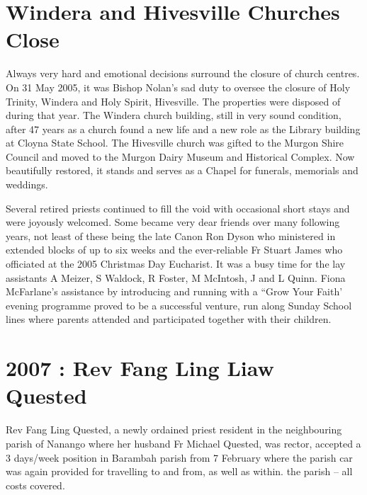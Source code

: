 \section{Windera and Hivesville Churches Close}



Always very hard and emotional decisions surround the closure of church centres. On 31 May 2005, it was Bishop Nolan's sad duty to oversee the closure of Holy Trinity, Windera and Holy Spirit, Hivesville. The properties were disposed of during that year. The Windera church building, still in very sound condition, after 47 years as a church found a new life and a new role as the Library building at Cloyna State School. The Hivesville church was gifted to the Murgon Shire Council and moved to the Murgon Dairy Museum and Historical Complex. Now beautifully restored, it stands and serves as a Chapel for funerals, memorials and weddings.



Several retired priests continued to fill the void with occasional short stays and were joyously welcomed. Some became very dear friends over many following years, not least of these being the late Canon Ron Dyson who ministered in extended blocks of up to six weeks and the ever-reliable Fr Stuart James who officiated at the 2005 Christmas Day Eucharist. It was a busy time for the lay assistants A Meizer, S Waldock, R Foster, M McIntosh, J and L Quinn. Fiona McFarlane's assistance by introducing and running with a ``Grow Your Faith' evening programme proved to be a successful venture, run along Sunday School lines where parents attended and participated together with their children.



\section{2007 : Rev Fang Ling Liaw Quested}



Rev Fang Ling Quested, a newly ordained priest resident in the neighbouring parish of Nanango where her husband Fr Michael Quested, was rector, accepted a 3 days/week position in Barambah parish from 7 February where the parish car was again provided for travelling to and from, as well as within. the parish -- all costs covered.



